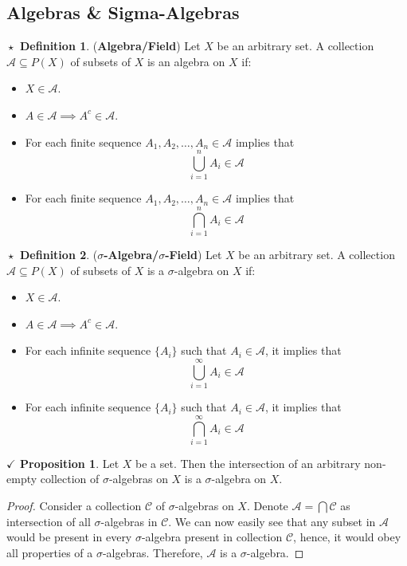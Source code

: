 \documentclass{article}
\theoremstyle{definition}
\newtheorem{definition}{$\boxed{\star}$ Definition}
\theoremstyle{remark}
\theoremstyle{definition}
\theoremstyle{definition}
\newtheorem{proposition}{$\checkmark$ Proposition}
\theoremstyle{definition}
\newcommand{\bunion}{\bigcup}
\newcommand{\bintrs}{\bigcap}
\newcommand{\alg}[1]{\mathscr{#1}}
\begin{document}
\subsection{Algebras \& Sigma-Algebras}
\begin{definition}
	(\textbf{Algebra/Field}) Let $ X $ be an arbitrary set. A collection $ \alg{A} \subseteq P(X)$ of subsets of $ X $ is an algebra on $ X $ if:
	\begin{itemize}
		\item {$ X\in \alg{A} $.}
		\item {$ A\in \alg{A} \implies A^c \in \alg{A}$.}
		\item {For each finite sequence $ A_1,A_2,\dots, A_n \in \alg{A}$ implies that
	\[\bunion_{i=1}^n A_i \in \alg{A}\]	
	 }
 \item {For each finite sequence $ A_1,A_2,\dots,A_n\in\alg{A} $ implies that
\[\bintrs_{i=1}^nA_i \in\alg{A}\] 
}
	\end{itemize}
\end{definition}
\hrulefill
\begin{definition}
	(\textbf{$ \sigma $-Algebra/$ \sigma $-Field}) Let $ X $ be an arbitrary set. A collection $ \alg{A} \subseteq P(X)$ of subsets of $ X $ is a $ \sigma $-algebra on $ X $ if:
	\begin{itemize}
		\item {$ X\in \alg{A} $.}
		\item {$ A\in\alg{A} \implies A^c\in \alg{A}$.}
		\item {For each infinite sequence $ \{A_i\} $ such that $ A_i\in \alg{A} $, it implies that
	\[\bunion_{i=1}^\infty A_i \in\alg{A}\]	
	}
\item{For each infinite sequence $ \{A_i\} $ such that $ A_i\in \alg{A} $, it implies that
	\[\bintrs_{i=1}^\infty A_i \in\alg{A}\]} 
	\end{itemize}
\end{definition}
\hrulefill
\begin{proposition}
	\label{P-1}
	Let $ X $ be a set. Then the intersection of an arbitrary non-empty collection of $ \sigma $-algebras on $ X $ is a $ \sigma $-algebra on $ X $.
\end{proposition}
\begin{proof}
	Consider a collection $ \alg{C} $ of $ \sigma $-algebras on $ X $. Denote $ \alg{A} = \bintrs\alg{C} $ as intersection of all $ \sigma $-algebras in $ \alg{C}$. We can now easily see that any subset in $ \alg{A} $ would be present in every $ \sigma $-algebra present in collection $ \alg{C} $, hence, it would obey all properties of a $ \sigma $-algebras. Therefore, $ \alg{A} $ is a $ \sigma $-algebra.
\end{proof}
\end{document}
